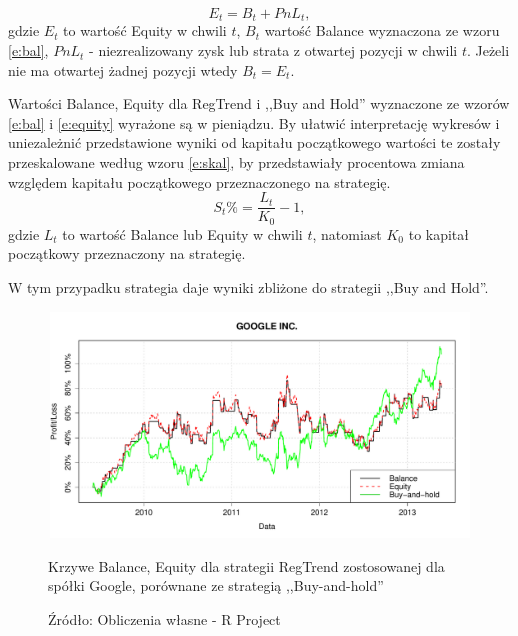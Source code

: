 \documentclass[man,mfu]{mgrwms}
\begin{document}
\begin{equation}\label{e:equity}
E_t = B_t + PnL_t,
\end{equation}
gdzie $E_t$ to wartość Equity w chwili $t$, $B_t$ wartość Balance wyznaczona ze wzoru \ref{e:bal}, $PnL_t$ - niezrealizowany zysk lub strata z otwartej pozycji w chwili $t$. Jeżeli nie ma otwartej żadnej pozycji wtedy $B_t=E_t$.

Wartości Balance, Equity dla RegTrend i ,,Buy and Hold'' wyznaczone ze wzorów \ref{e:bal} i \ref{e:equity} wyrażone są w pieniądzu. By ułatwić interpretację wykresów i uniezależnić przedstawione wyniki od kapitału początkowego wartości te zostały przeskalowane według wzoru \ref{e:skal}, by przedstawiały procentowa zmiana względem kapitału początkowego przeznaczonego na strategię.
\begin{equation}\label{e:skal}
S_t\% = \frac{L_t}{K_0}-1,
\end{equation}
gdzie $L_t$ to wartość  Balance lub Equity w chwili $t$, natomiast $K_0$ to kapitał początkowy przeznaczony na strategię.

W tym przypadku strategia daje wyniki zbliżone do strategii ,,Buy and Hold''.
\begin{figure}[H]
\centering
\vspace{-10pt}
\includegraphics[width=120mm,height = 60mm]{google}\vspace{-10pt}
\caption{Krzywe Balance, Equity dla strategii RegTrend zostosowanej dla spółki Google, porównane ze strategią ,,Buy-and-hold''}
\caption*{Źródło: Obliczenia własne - R Project}
\label{fig:google}\vspace{-10pt}
\end{figure}
\end{document}
